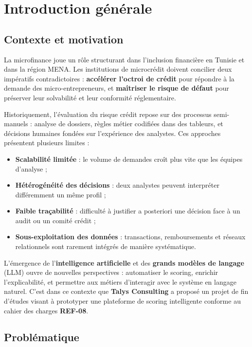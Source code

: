 \chapter{Introduction générale}
\label{ch:intro}

\section{Contexte et motivation}

La microfinance joue un rôle structurant dans l'inclusion financière en Tunisie et dans la région MENA. Les institutions de microcrédit doivent concilier deux impératifs contradictoires : \textbf{accélérer l'octroi de crédit} pour répondre à la demande des micro-entrepreneurs, et \textbf{maîtriser le risque de défaut} pour préserver leur solvabilité et leur conformité réglementaire.

Historiquement, l'évaluation du risque crédit repose sur des processus semi-manuels : analyse de dossiers, règles métier codifiées dans des tableurs, et décisions humaines fondées sur l'expérience des analystes. Ces approches présentent plusieurs limites :
\begin{itemize}[leftmargin=*]
  \item \textbf{Scalabilité limitée} : le volume de demandes croît plus vite que les équipes d'analyse ;
  \item \textbf{Hétérogénéité des décisions} : deux analystes peuvent interpréter différemment un même profil ;
  \item \textbf{Faible traçabilité} : difficulté à justifier a posteriori une décision face à un audit ou un comité crédit ;
  \item \textbf{Sous-exploitation des données} : transactions, remboursements et réseaux relationnels sont rarement intégrés de manière systématique.
\end{itemize}

L'émergence de l'\textbf{intelligence artificielle} et des \textbf{grands modèles de langage} (LLM) ouvre de nouvelles perspectives : automatiser le scoring, enrichir l'explicabilité, et permettre aux métiers d'interagir avec le système en langage naturel. C'est dans ce contexte que \textbf{Talys Consulting} a proposé un projet de fin d'études visant à prototyper une plateforme de scoring intelligente conforme au cahier des charges \textbf{REF-08}.

\section{Problématique}

